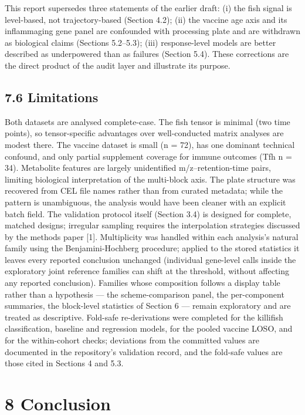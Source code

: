 \documentclass[
]{article}
\begin{document}
This report supersedes three statements of the earlier draft: (i) the
fish signal is level-based, not trajectory-based (Section 4.2); (ii) the
vaccine age axis and its inflammaging gene panel are confounded with
processing plate and are withdrawn as biological claims (Sections
5.2--5.3); (iii) response-level models are better described as
underpowered than as failures (Section 5.4). These corrections are the
direct product of the audit layer and illustrate its purpose.

\subsection{7.6 Limitations}\label{limitations}

Both datasets are analysed complete-case. The fish tensor is minimal
(two time points), so tensor-specific advantages over well-conducted
matrix analyses are modest there. The vaccine dataset is small (n = 72),
has one dominant technical confound, and only partial supplement
coverage for immune outcomes (Tfh n = 34). Metabolite features are
largely unidentified m/z--retention-time pairs, limiting biological
interpretation of the multi-block axis. The plate structure was
recovered from CEL file names rather than from curated metadata; while
the pattern is unambiguous, the analysis would have been cleaner with an
explicit batch field. The validation protocol itself (Section 3.4) is
designed for complete, matched designs; irregular sampling requires the
interpolation strategies discussed by the methods paper {[}1{]}.
Multiplicity was handled within each analysis's natural family using the
Benjamini-Hochberg procedure; applied to the stored statistics it leaves
every reported conclusion unchanged (individual gene-level calls inside
the exploratory joint reference families can shift at the threshold,
without affecting any reported conclusion). Families whose composition
follows a display table rather than a hypothesis --- the
scheme-comparison panel, the per-component summaries, the block-level
statistics of Section 6 --- remain exploratory and are treated as
descriptive. Fold-safe re-derivations were completed for the killifish
classification, baseline and regression models, for the pooled vaccine
LOSO, and for the within-cohort checks; deviations from the committed
values are documented in the repository's validation record, and the
fold-safe values are those cited in Sections 4 and 5.3.

\section{8 Conclusion}\label{conclusion}
\end{document}
